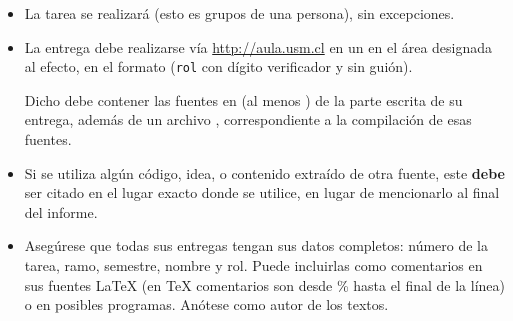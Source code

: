   \begin{itemize}
  \item
    La tarea se realizará 
    (esto es grupos de una persona),
    sin excepciones.
  \item
    La entrega debe realizarse vía \url{http://aula.usm.cl}
    en un  en el área designada al efecto,
    en el formato 
    (\texttt{rol} con dígito verificador y sin guión).

    Dicho  debe contener las fuentes en \LaTeXe{}
    (al menos )
    de la parte escrita de su entrega,
    además de un archivo ,
    correspondiente a la compilación de esas fuentes.
  \item Si se utiliza algún código, idea, o contenido extraído de otra fuente, este \textbf{debe} ser citado en el lugar exacto donde se utilice, en lugar de mencionarlo al final del informe. 
  \item
    Asegúrese que todas sus entregas tengan sus datos completos:
    número de la tarea, ramo, semestre, nombre y rol.
    Puede incluirlas como comentarios en sus fuentes \LaTeX{}
    (en \TeX{} comentarios son desde \% hasta el final de la línea)
    o en posibles programas.
    Anótese como autor de los textos.
 

\end{itemize}
